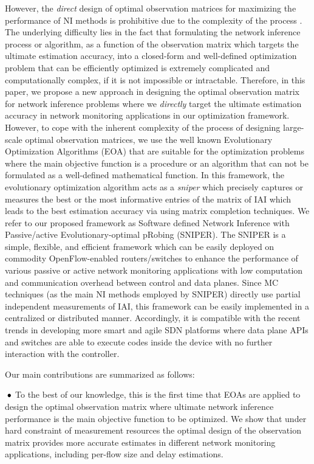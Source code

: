 However, the \emph{direct} design of optimal observation matrices for maximizing the performance of NI methods is prohibitive due to the complexity of the process \cite{IF14iSTAMP:2014}\cite{Elad:2007}. The underlying difficulty lies in the fact that formulating the network inference process or algorithm, as a function of the observation matrix which targets the ultimate estimation accuracy, into a closed-form and well-defined optimization problem that can be efficiently optimized is extremely complicated and computationally complex, if it is not impossible or intractable. Therefore, in this paper, we propose a new approach in designing the optimal observation matrix for network inference problems where we \emph{directly} target the ultimate estimation accuracy in network monitoring applications in our optimization framework. However, to cope with the inherent complexity of the process of designing large-scale optimal observation matrices, we use the well known Evolutionary Optimization Algorithms (EOA) that are suitable for the optimization problems where the main objective function is a procedure or an algorithm that can not be formulated as a well-defined mathematical function. In this framework, the evolutionary optimization algorithm acts as a \emph{sniper} which precisely captures or measures the best or the most informative entries of the matrix of IAI which leads to the best estimation accuracy via using matrix completion techniques. 
We refer to our proposed framework as Software defined Network Inference with Passive/active Evolutionary-optimal pRobing (SNIPER). The SNIPER is a simple, flexible, and efficient framework which can be easily deployed on commodity OpenFlow-enabled routers/switches to enhance the performance of various passive or active network monitoring applications with low computation and communication overhead between control and data planes. Since MC techniques (as the main NI methods employed by SNIPER) directly use partial independent measurements of IAI, this framework can be easily implemented in a centralized or distributed manner. Accordingly, it is compatible with the recent trends in developing more smart and agile SDN platforms \cite{Bianchi:2014}\cite{Moshref:2014} where data plane APIs and switches are able to execute codes inside the device with no further interaction with the controller. 

Our main contributions are summarized as follows:

\textbf{$\text{\hspace{0.1cm}}\bullet$} To the best of our knowledge, this is the first time that EOAs are applied to design the optimal observation matrix where ultimate network inference performance is the main objective function to be optimized. We show that under hard constraint of measurement resources the optimal design of the observation matrix provides more accurate estimates in different network monitoring applications, including per-flow size and delay estimations.

